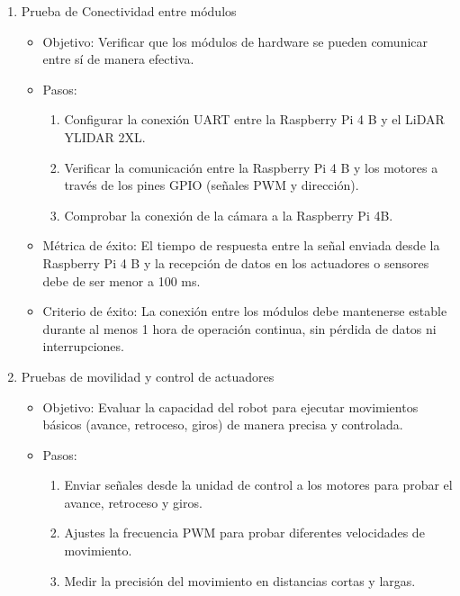     \begin{enumerate}
        \item Prueba de Conectividad entre m\'odulos
        \begin{itemize}
            \item Objetivo: Verificar que los m\'odulos de hardware se pueden comunicar
                entre s\'i de manera efectiva.
            \item Pasos:
                \begin{enumerate}
                    \item Configurar la conexi\'on UART entre la Raspberry Pi 4 B y el LiDAR YLIDAR 2XL.
                    \item Verificar la comunicaci\'on entre la Raspberry Pi 4 B y los motores a trav\'es de los pines GPIO (se\~nales PWM y direcci\'on).
                    \item Comprobar la conexi\'on de la c\'amara a la Raspberry Pi 4B.
                \end{enumerate}
            \item M\'etrica de \'exito: El tiempo de respuesta entre la se\~nal enviada desde la Raspberry Pi 4 B y la 
                recepci\'on de datos en los actuadores o sensores debe de ser menor a 100 ms.
            \item Criterio de \'exito: La conexi\'on entre los m\'odulos debe mantenerse
                estable durante al menos 1 hora de operaci\'on continua, sin p\'erdida de
                datos ni interrupciones.
        \end{itemize}
        \item Pruebas de movilidad y control de actuadores
        \begin{itemize}
            \item Objetivo: Evaluar la capacidad del robot para ejecutar movimientos b\'asicos
                (avance, retroceso, giros) de manera precisa y controlada.
            \item Pasos:
                \begin{enumerate}
                    \item Enviar se\~nales desde la unidad de control a los motores para probar el avance, retroceso y giros.
                    \item Ajustes la frecuencia PWM para probar diferentes velocidades de movimiento.
                    \item Medir la precisi\'on del movimiento en distancias cortas y largas.

\end{enumerate}
\end{itemize}
\end{enumerate}
